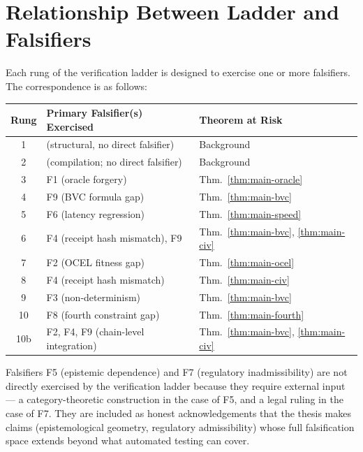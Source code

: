 \section{Relationship Between Ladder and Falsifiers}
\label{sec:ladder-falsifiers-relationship}

Each rung of the verification ladder is designed to exercise one or more falsifiers.
The correspondence is as follows:

\medskip
\begin{center}
\begin{tabular}{cll}
\toprule
\textbf{Rung} & \textbf{Primary Falsifier(s) Exercised} & \textbf{Theorem at Risk} \\
\midrule
1   & (structural, no direct falsifier)      & Background \\
2   & (compilation; no direct falsifier)     & Background \\
3   & F1 (oracle forgery)                    & Thm.~\ref{thm:main-oracle} \\
4   & F9 (BVC formula gap)                   & Thm.~\ref{thm:main-bvc} \\
5   & F6 (latency regression)                & Thm.~\ref{thm:main-speed} \\
6   & F4 (receipt hash mismatch), F9         & Thm.~\ref{thm:main-bvc}, \ref{thm:main-civ} \\
7   & F2 (OCEL fitness gap)                  & Thm.~\ref{thm:main-ocel} \\
8   & F4 (receipt hash mismatch)             & Thm.~\ref{thm:main-civ} \\
9   & F3 (non-determinism)                   & Thm.~\ref{thm:main-bvc} \\
10  & F8 (fourth constraint gap)             & Thm.~\ref{thm:main-fourth} \\
10b & F2, F4, F9 (chain-level integration)   & Thm.~\ref{thm:main-bvc}, \ref{thm:main-civ} \\
\bottomrule
\end{tabular}
\end{center}

\medskip
Falsifiers F5 (epistemic dependence) and F7 (regulatory inadmissibility) are not
directly exercised by the verification ladder because they require external input —
a category-theoretic construction in the case of F5, and a legal ruling in the case
of F7. They are included as honest acknowledgements that the thesis makes claims
(epistemological geometry, regulatory admissibility) whose full falsification space
extends beyond what automated testing can cover.

